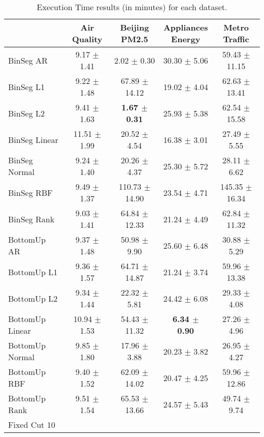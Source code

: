 \begin{table}[!htpb] \small
    \caption{Execution Time results (in minutes) for each dataset.}
    \centering
    \begin{tabular}{lcccc}
        \toprule
        & \makecell{\textbf{Air}\\\textbf{Quality}} 
        & \makecell{\textbf{Beijing}\\\textbf{PM2.5}} 
        & \makecell{\textbf{Appliances}\\\textbf{Energy}} 
        & \makecell{\textbf{Metro}\\\textbf{Traffic}} \\
        \midrule
BinSeg AR & 9.17 $\pm$ 1.41 & 2.02 $\pm$ 0.30 & 30.30 $\pm$ 5.06 & 59.43 $\pm$ 11.15 \\
BinSeg L1 & 9.22 $\pm$ 1.48 & 67.89 $\pm$ 14.12 & 19.02 $\pm$ 4.04 & 62.63 $\pm$ 13.41 \\
BinSeg L2 & 9.41 $\pm$ 1.63 & \textbf{1.67 $\pm$ 0.31} & 25.93 $\pm$ 5.38 & 62.54 $\pm$ 15.58 \\
BinSeg Linear & 11.51 $\pm$ 1.99 & 20.52 $\pm$ 4.54 & 16.38 $\pm$ 3.01 & 27.49 $\pm$ 5.55 \\
BinSeg Normal & 9.24 $\pm$ 1.40 & 20.26 $\pm$ 4.37 & 25.30 $\pm$ 5.72 & 28.11 $\pm$ 6.62 \\
BinSeg RBF & 9.49 $\pm$ 1.37 & 110.73 $\pm$ 14.90 & 23.54 $\pm$ 4.71 & 145.35 $\pm$ 16.34 \\
BinSeg Rank & 9.03 $\pm$ 1.41 & 64.84 $\pm$ 12.33 & 21.24 $\pm$ 4.49 & 62.84 $\pm$ 11.32 \\
BottomUp AR & 9.37 $\pm$ 1.48 & 50.98 $\pm$ 9.90 & 25.60 $\pm$ 6.48 & 30.88 $\pm$ 5.29 \\
BottomUp L1 & 9.36 $\pm$ 1.57 & 64.71 $\pm$ 14.87 & 21.24 $\pm$ 3.74 & 59.96 $\pm$ 13.38 \\
BottomUp L2 & 9.34 $\pm$ 1.44 & 22.32 $\pm$ 5.81 & 24.42 $\pm$ 6.08 & 29.33 $\pm$ 4.08 \\
BottomUp Linear & 10.94 $\pm$ 1.53 & 54.43 $\pm$ 11.32 & \textbf{6.34 $\pm$ 0.90} & 27.26 $\pm$ 4.96 \\
BottomUp Normal & 9.85 $\pm$ 1.80 & 17.96 $\pm$ 3.88 & 20.23 $\pm$ 3.82 & 26.95 $\pm$ 4.27 \\
BottomUp RBF & 9.40 $\pm$ 1.52 & 62.09 $\pm$ 14.02 & 20.47 $\pm$ 4.25 & 59.96 $\pm$ 12.86 \\
BottomUp Rank & 9.51 $\pm$ 1.54 & 65.53 $\pm$ 13.66 & 24.57 $\pm$ 5.43 & 49.74 $\pm$ 9.74 \\
Fixed Cut 10%

\end{tabular}
\end{table}
